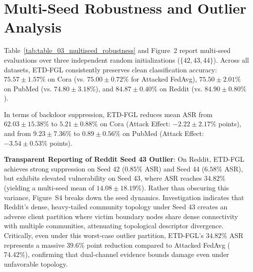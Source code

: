 \section{Multi-Seed Robustness and Outlier Analysis}
\label{sec:multiseed_robustness}
Table~\ref{tab:table_03_multiseed_robustness} and Figure~2 report multi-seed evaluations over three independent random initializations ($\{42, 43, 44\}$).
Across all datasets, \textsc{ETD-FGL} consistently preserves clean classification accuracy:
$75.57 \pm 1.57\%$ on Cora (vs. $75.00 \pm 0.72\%$ for Attacked FedAvg),
$75.50 \pm 2.01\%$ on PubMed (vs. $74.80 \pm 3.18\%$),
and $84.87 \pm 0.40\%$ on Reddit (vs. $84.90 \pm 0.80\%$).

In terms of backdoor suppression, \textsc{ETD-FGL} reduces mean ASR from $62.03 \pm 15.38\%$ to $5.21 \pm 0.88\%$ on Cora (Attack Effect: $-2.22 \pm 2.17\%$ points), and from $9.23 \pm 7.36\%$ to $0.89 \pm 0.56\%$ on PubMed (Attack Effect: $-3.54 \pm 0.53\%$ points).

\textbf{Transparent Reporting of Reddit Seed 43 Outlier}:
On Reddit, \textsc{ETD-FGL} achieves strong suppression on Seed 42 ($0.85\%$ ASR) and Seed 44 ($6.58\%$ ASR), but exhibits elevated vulnerability on Seed 43, where ASR reaches $34.82\%$ (yielding a multi-seed mean of $14.08 \pm 18.19\%$).
Rather than obscuring this variance, Figure~S4 breaks down the seed dynamics.
Investigation indicates that Reddit's dense, heavy-tailed community topology under Seed 43 creates an adverse client partition where victim boundary nodes share dense connectivity with multiple communities, attenuating topological descriptor divergence.
Critically, even under this worst-case outlier partition, \textsc{ETD-FGL}'s $34.82\%$ ASR represents a massive $39.6\%$ point reduction compared to Attacked FedAvg ($74.42\%$), confirming that dual-channel evidence bounds damage even under unfavorable topology.
